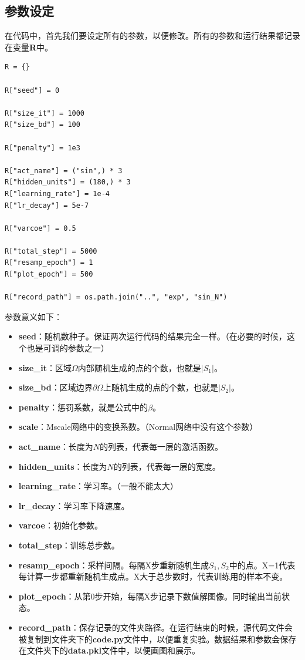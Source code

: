 \documentclass[12pt,a4paper]{article}
\begin{document}
\subsection*{参数设定}

在代码中，首先我们要设定所有的参数，以便修改。所有的参数和运行结果都记录在变量\textbf{R}中。

\begin{lstlisting}
R = {}

R["seed"] = 0

R["size_it"] = 1000
R["size_bd"] = 100

R["penalty"] = 1e3

R["act_name"] = ("sin",) * 3
R["hidden_units"] = (180,) * 3
R["learning_rate"] = 1e-4
R["lr_decay"] = 5e-7

R["varcoe"] = 0.5

R["total_step"] = 5000
R["resamp_epoch"] = 1
R["plot_epoch"] = 500

R["record_path"] = os.path.join("..", "exp", "sin_N")
\end{lstlisting}

参数意义如下：

\begin{itemize}
\item \textbf{seed}：随机数种子。保证两次运行代码的结果完全一样。（在必要的时候，这个也是可调的参数之一）
\item \textbf{size\_it}：区域$\Omega$内部随机生成的点的个数，也就是$|S_1|$。
\item \textbf{size\_bd}：区域边界$\partial \Omega$上随机生成的点的个数，也就是$|S_2|$。
\item \textbf{penalty}：惩罚系数，就是公式中的$\beta$。
\item \textbf{scale}：Mscale网络中的变换系数。（Normal网络中没有这个参数）
\item \textbf{act\_name}：长度为$N$的列表，代表每一层的激活函数。
\item \textbf{hidden\_units}：长度为$N$的列表，代表每一层的宽度。
\item \textbf{learning\_rate}：学习率。（一般不能太大）
\item \textbf{lr\_decay}：学习率下降速度。
\item \textbf{varcoe}：初始化参数。
\item \textbf{total\_step}：训练总步数。
\item \textbf{resamp\_epoch}：采样间隔。每隔X步重新随机生成$S_1,S_2$中的点。X=1代表每计算一步都重新随机生成点。X大于总步数时，代表训练用的样本不变。
\item \textbf{plot\_epoch}：从第0步开始，每隔X步记录下数值解图像。同时输出当前状态。
\item \textbf{record\_path}：保存记录的文件夹路径。在运行结束的时候，源代码文件会被复制到文件夹下的\textbf{code.py}文件中，以便重复实验。数据结果和参数会保存在文件夹下的\textbf{data.pkl}文件中，以便画图和展示。
\end{itemize}
\end{document}

